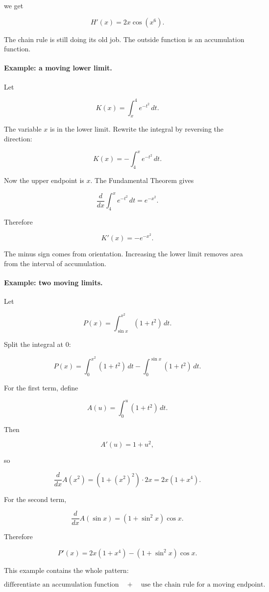 we get

\[
\boxed{
H'(x)=2x\cos(x^6).
}
\]

The chain rule is still doing its old job.  The outside function is an accumulation
function.

\paragraph{Example: a moving lower limit.}
Let

\[
K(x)=\int_x^4 e^{-t^2}\,dt.
\]

The variable \(x\) is in the lower limit.  Rewrite the integral by reversing the direction:

\[
K(x)=-\int_4^x e^{-t^2}\,dt.
\]

Now the upper endpoint is \(x\).  The Fundamental Theorem gives

\[
\frac{d}{dx}\int_4^x e^{-t^2}\,dt=e^{-x^2}.
\]

Therefore

\[
\boxed{
K'(x)=-e^{-x^2}.
}
\]

The minus sign comes from orientation.  Increasing the lower limit removes area from
the interval of accumulation.

\paragraph{Example: two moving limits.}
Let

\[
P(x)=\int_{\sin x}^{x^2} (1+t^2)\,dt.
\]

Split the integral at \(0\):

\[
P(x)
=
\int_0^{x^2}(1+t^2)\,dt
-
\int_0^{\sin x}(1+t^2)\,dt.
\]

For the first term, define

\[
A(u)=\int_0^u (1+t^2)\,dt.
\]

Then

\[
A'(u)=1+u^2,
\]

so

\[
\frac{d}{dx}A(x^2)
=
(1+(x^2)^2)\cdot 2x
=
2x(1+x^4).
\]

For the second term,

\[
\frac{d}{dx}A(\sin x)
=
(1+\sin^2 x)\cos x.
\]

Therefore

\[
\boxed{
P'(x)=2x(1+x^4)-(1+\sin^2 x)\cos x.
}
\]

This example contains the whole pattern:

\[
\text{differentiate an accumulation function}
\quad+\quad
\text{use the chain rule for a moving endpoint}.
\]


